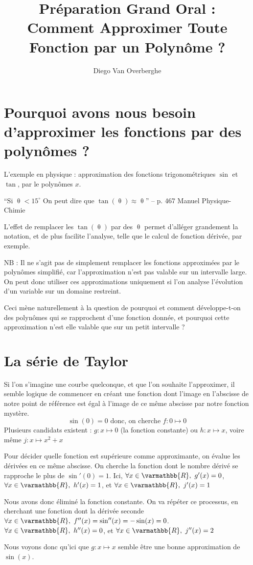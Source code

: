 \documentclass{scrartcl}
\title{\vspace{-3cm}Préparation Grand Oral : Comment Approximer Toute Fonction par un Polynôme ?}
\author{Diego Van Overberghe}
\begin{document}
    \maketitle
    \section*{Pourquoi avons nous besoin d'approximer les fonctions par des polynômes ?}
    L'exemple en physique : approximation des fonctions trigonométriques $\sin$ et $\tan$, par le polynômes $x$.
    \begin{center}
        ``Si $\uptheta<15^{\circ}$ On peut dire que $\tan(\uptheta)\approx\uptheta$'' -- p. 467 Manuel Physique-Chimie
    \end{center}
    L'effet de remplacer les $\tan(\uptheta)$ par des $\uptheta$ permet d'alléger grandement la notation, et de plus facilite l'analyse, telle que le calcul de fonction dérivée, par exemple. 

    $\mathrm{N}\mathrm{B}$ : Il ne s'agit pas de simplement remplacer les fonctions approximées par le polynômes simplifié, car l'approximation n'est pas valable sur un intervalle large. On peut donc utiliser ces approximations uniquement si l'on analyse l'évolution d'un variable sur un domaine restreint.

    Ceci mène naturellement à la question de pourquoi et comment développe-t-on des polynômes qui se rapprochent d'une fonction donnée, et pourquoi cette approximation n'est elle valable que sur un petit intervalle ?

    \section*{La série de Taylor}
    Si l'on s'imagine une courbe quelconque, et que l'on souhaite l'approximer, il semble logique de commencer en créant une fonction dont l'image en l'abscisse de notre point de référence est égal à l'image de ce même abscisse par notre fonction mystère.
    \[\sin(0)=0\text{ donc, on cherche }f:0\mapsto 0\]
    Plusieurs candidats existent : $g:x\mapsto 0$ (la fonction constante) ou $h:x\mapsto x$, voire même $j:x\mapsto x^2+x$
    
    Pour décider quelle fonction est supérieure comme approximante, on évalue les dérivées en ce même abscisse. On cherche la fonction dont le nombre dérivé se rapproche le plus de $\sin'(0)=1$. Ici, $\forall x\in\varmathbb{R},\ g'(x)=0$, $\forall x\in\varmathbb{R},\ h'(x)=1$, et $\forall x\in\varmathbb{R},\ j'(x)=1$

    Nous avons donc éliminé la fonction constante. On va répéter ce processus, en cherchant une fonction dont la dérivée seconde $\forall x\in\varmathbb{R},\ f''(x)=\sin''(x)=-\sin(x)=0$. $\forall x\in\varmathbb{R},\ h''(x)=0$, et $\forall x\in\varmathbb{R},\ j''(x)=2$

    Nous voyons donc qu'ici que $g:x\mapsto x$ semble être une bonne approximation de $\sin(x)$.
\end{document}
